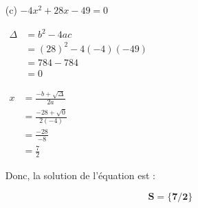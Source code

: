 \documentclass[12pt,a4paper]{article}
\begin{document}
\begin{enumerate}
    \item[(c)] \( -4x^2 + 28x - 49 = 0 \) 
    
\(
\begin{aligned}
\Delta &= b^2 - 4ac \\
       &= (28)^2 - 4(-4)(-49) \\
       &= 784 - 784 \\
       &= 0
\end{aligned}
\)

\(
\begin{aligned}
x &= \frac{-b + \sqrt{\Delta}}{2a} \\
  &= \frac{-28 + \sqrt{0}}{2(-4)} \\
  &= \frac{-28}{-8} \\
  &= \frac{7}{2}
\end{aligned}
\)

Donc, la solution de l'équation est :

\begin{tcolorbox}[colback=yellow!20, colframe=black, sharp corners]
    \[
    \mathbf{S = \{ 7/2 \}}
    \]
\end{tcolorbox}

\end{enumerate}
\end{document}
